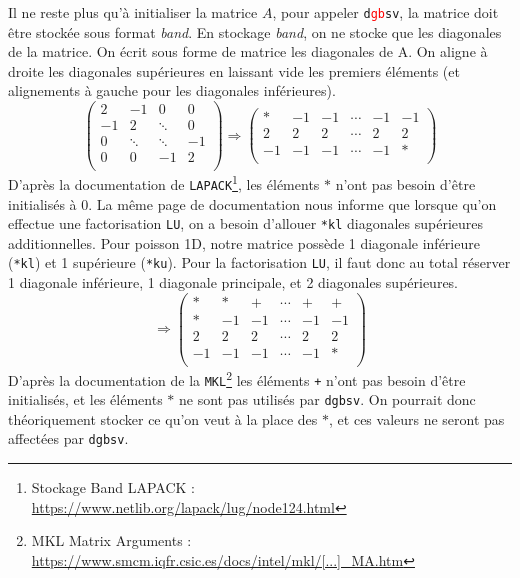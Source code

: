\documentclass{article}
\begin{document}
Il ne reste plus qu'à initialiser la matrice $A$, pour appeler \texttt{d\textcolor{red}{gb}sv}, la matrice doit être stockée sous format \textit{band}.
En stockage \textit{band}, on ne stocke que les diagonales de la matrice. On écrit sous forme de matrice les diagonales de A. On aligne à droite les diagonales supérieures en laissant vide les premiers éléments (et alignements à gauche pour les diagonales inférieures).
\[
\begin{pmatrix}
		2	& 	-1	&	0	& 0	\\
		-1	&	2	&\ddots	& 0	\\
		0	& \ddots&\ddots	&-1	\\
		0	& 	0	& -1 	& 2	\\
	\end{pmatrix}
	\Longrightarrow
	\begin{pmatrix}
		\ast& 	-1	&	-1	&	\cdots	&	-1	&	-1	\\
		2	& 	2	&	2	&	\cdots	&	2	&	2	\\
		-1	& 	-1	&	-1	&	\cdots	&	-1	&	\ast\\
	\end{pmatrix}
\]
D'après la documentation de \texttt{LAPACK}\footnote{Stockage Band LAPACK : \href{https://www.netlib.org/lapack/lug/node124.html}{https://www.netlib.org/lapack/lug/node124.html}}, les éléments $\ast$ n'ont pas besoin d'être initialisés à 0.
La même page de documentation nous informe que lorsque qu'on effectue une factorisation \texttt{LU}, on a besoin d'allouer \texttt{*kl} diagonales supérieures additionnelles. Pour poisson 1D, notre matrice possède 1 diagonale inférieure (\texttt{*kl}) et 1 supérieure (\texttt{*ku}). Pour la factorisation \texttt{LU}, il faut donc au total réserver 1 diagonale inférieure, 1 diagonale principale, et 2 diagonales supérieures.
\[ 
	\Longrightarrow
	\begin{pmatrix}
		\ast& \ast	&	\texttt{+}	&	\cdots	&	\texttt{+}	&	\texttt{+}	\\
		\ast& 	-1	&	-1	&	\cdots	&	-1	&	-1	\\
		2	& 	2	&	2	&	\cdots	&	2	&	2	\\
		-1	& 	-1	&	-1	&	\cdots	&	-1	&	\ast\\
	\end{pmatrix}
\]
D'après la documentation de la \texttt{MKL}\footnote{MKL Matrix Arguments : \href{https://www.smcm.iqfr.csic.es/docs/intel/mkl/mkl_manual/appendices/mkl_appB_MA.htm}{https://www.smcm.iqfr.csic.es/docs/intel/mkl/[...]\_MA.htm}} les éléments \texttt{+} n'ont pas besoin d'être initialisés, et les éléments $\ast$ ne sont pas utilisés par \texttt{dgbsv}. On pourrait donc théoriquement stocker ce qu'on veut à la place des $\ast$, et ces valeurs ne seront pas affectées par \texttt{dgbsv}.
\end{document}
